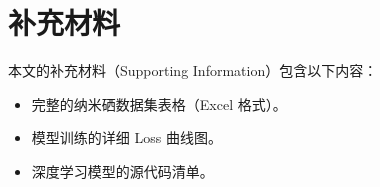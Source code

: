 \section{补充材料}

本文的补充材料（Supporting Information）包含以下内容：
\begin{itemize}
  \item 完整的纳米硒数据集表格（Excel 格式）。
  \item 模型训练的详细 Loss 曲线图。
  \item 深度学习模型的源代码清单。
\end{itemize}